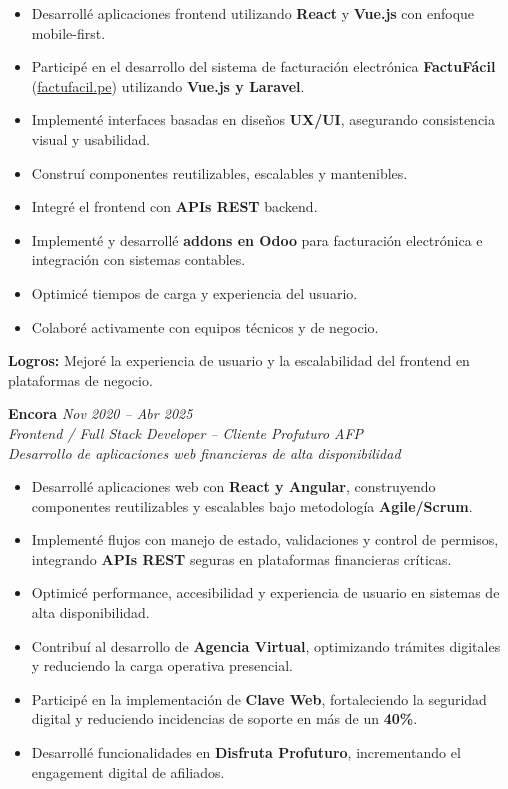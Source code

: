 \documentclass[11pt,a4paper]{article}
\begin{document}
\begin{itemize}[leftmargin=*]
  \item Desarrollé aplicaciones frontend utilizando \textbf{React} y \textbf{Vue.js} con enfoque mobile-first.
  \item Participé en el desarrollo del sistema de facturación electrónica \textbf{FactuFácil} (\href{https://factufacil.pe/}{factufacil.pe}) utilizando \textbf{Vue.js y Laravel}.
  \item Implementé interfaces basadas en diseños \textbf{UX/UI}, asegurando consistencia visual y usabilidad.
  \item Construí componentes reutilizables, escalables y mantenibles.
  \item Integré el frontend con \textbf{APIs REST} backend.
  \item Implementé y desarrollé \textbf{addons en Odoo} para facturación electrónica e integración con sistemas contables.
  \item Optimicé tiempos de carga y experiencia del usuario.
  \item Colaboré activamente con equipos técnicos y de negocio.
\end{itemize}

\textbf{Logros:} Mejoré la experiencia de usuario y la escalabilidad del frontend en plataformas de negocio.

\vspace{6pt}

\textbf{Encora} \hfill \textit{Nov 2020 – Abr 2025}\\
\textit{Frontend / Full Stack Developer – Cliente Profuturo AFP}\\
\textit{Desarrollo de aplicaciones web financieras de alta disponibilidad}

\begin{itemize}[leftmargin=*]
  \item Desarrollé aplicaciones web con \textbf{React y Angular}, construyendo componentes reutilizables y escalables bajo metodología \textbf{Agile/Scrum}.
  \item Implementé flujos con manejo de estado, validaciones y control de permisos, integrando \textbf{APIs REST} seguras en plataformas financieras críticas.
  \item Optimicé performance, accesibilidad y experiencia de usuario en sistemas de alta disponibilidad.
  \item Contribuí al desarrollo de \textbf{Agencia Virtual}, optimizando trámites digitales y reduciendo la carga operativa presencial.
  \item Participé en la implementación de \textbf{Clave Web}, fortaleciendo la seguridad digital y reduciendo incidencias de soporte en más de un \textbf{40\%}.
  \item Desarrollé funcionalidades en \textbf{Disfruta Profuturo}, incrementando el engagement digital de afiliados.
\end{itemize}
\end{document}

